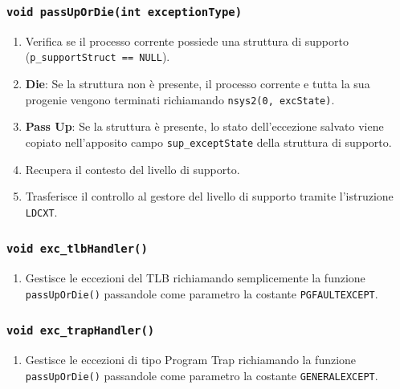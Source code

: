 \documentclass[a4paper,12pt]{article}
\begin{document}
\subsubsection{\texttt{void passUpOrDie(int exceptionType)}}
\begin{enumerate}
    \item Verifica se il processo corrente possiede una struttura di supporto (\texttt{p\_supportStruct == NULL}).
    \item \textbf{Die}: Se la struttura non è presente, il processo corrente e tutta la sua progenie vengono terminati richiamando \texttt{nsys2(0, excState)}.
    \item \textbf{Pass Up}: Se la struttura è presente, lo stato dell'eccezione salvato viene copiato nell'apposito campo \texttt{sup\_exceptState} della struttura di supporto.
    \item Recupera il contesto del livello di supporto.
    \item Trasferisce il controllo al gestore del livello di supporto tramite l'istruzione \texttt{LDCXT}.
\end{enumerate}

\subsubsection{\texttt{void exc\_tlbHandler()}}
\begin{enumerate}
    \item Gestisce le eccezioni del TLB richiamando semplicemente la funzione \texttt{passUpOrDie()} passandole come parametro la costante \texttt{PGFAULTEXCEPT}.
\end{enumerate}

\subsubsection{\texttt{void exc\_trapHandler()}}
\begin{enumerate}
    \item Gestisce le eccezioni di tipo Program Trap richiamando la funzione \texttt{passUpOrDie()} passandole come parametro la costante \texttt{GENERALEXCEPT}.
\end{enumerate}
\end{document}
